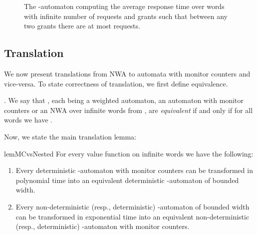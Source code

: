 \documentclass{lmcs}
\newcommand{\Paragraph}[1]{\noindent{\textbf{#1}}}
\begin{document}
\begin{exa}
\begin{figure}
\caption{The -automaton computing the average response time over words with infinite number of requests and grants such that between any two
grants there are at most  requests.}\label{fig:ART-k}
\end{figure}
\end{exa}


\subsection{Translation}
We now present translations from NWA to automata with monitor counters and vice-versa. To state correctness of translation, we first define equivalence.

\Paragraph{Equivalence of quantitative automata}. We say that , each being a weighted automaton, an automaton with monitor counters or an NWA over infinite words from , are \emph{equivalent}
 if and only if for all words  we have
.

Now, we state the main translation lemma:


\begin{restatable}{lem}{MCvsNested}\label{l:mc-vs-nested}
For every value function  on infinite words we have the following:
\begin{enumerate}
\item Every deterministic -automaton with monitor counters  can be transformed in polynomial time
into an equivalent deterministic -automaton of bounded width.
\item Every non-deterministic (resp., deterministic) -automaton of bounded width can be transformed in exponential time
into an equivalent non-deterministic (resp., deterministic) -automaton with monitor counters.
\end{enumerate}
\end{restatable}
\end{document}
